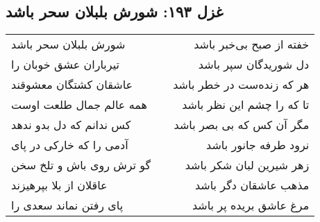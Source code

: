 \begin{center}
\section*{غزل ۱۹۳: شورش بلبلان سحر باشد}
\label{sec:193}
\begin{longtable}{l p{0.5cm} r}
شورش بلبلان سحر باشد
&&
خفته از صبح بی‌خبر باشد
\\
تیرباران عشق خوبان را
&&
دل شوریدگان سپر باشد
\\
عاشقان کشتگان معشوقند
&&
هر که زنده‌ست در خطر باشد
\\
همه عالم جمال طلعت اوست
&&
تا که را چشم این نظر باشد
\\
کس ندانم که دل بدو ندهد
&&
مگر آن کس که بی بصر باشد
\\
آدمی را که خارکی در پای
&&
نرود طرفه جانور باشد
\\
گو ترش روی باش و تلخ سخن
&&
زهر شیرین لبان شکر باشد
\\
عاقلان از بلا بپرهیزند
&&
مذهب عاشقان دگر باشد
\\
پای رفتن نماند سعدی را
&&
مرغ عاشق بریده پر باشد
\\
\end{longtable}
\end{center}
